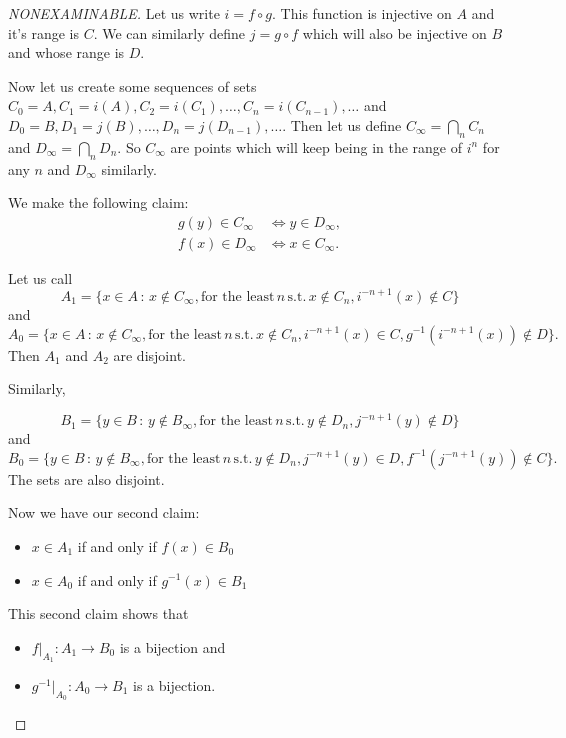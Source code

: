 \documentclass[
]{book}
\theoremstyle{definition}
\theoremstyle{definition}
\theoremstyle{definition}
\theoremstyle{definition}
\theoremstyle{remark}
\begin{document}
\begin{proof}[NONEXAMINABLE]
Let us write \(i = f\circ g\). This function is injective on \(A\) and it's range is \(C\). We can similarly define \(j = g \circ f\) which will also be injective on \(B\) and whose range is \(D\).

Now let us create some sequences of sets \(C_0 = A, C_1 = i(A), C_2=i(C_1), \dots, C_n = i(C_{n-1}), \dots\) and \(D_0 = B, D_1= j(B), \dots, D_n = j(D_{n-1}), \dots\). Then let us define \(C_\infty = \bigcap_n C_n\) and \(D_\infty = \bigcap_n D_n\). So \(C_\infty\) are points which will keep being in the range of \(i^n\) for any \(n\) and \(D_\infty\) similarly.

We make the following claim:
\begin{align}
g(y) \in C_\infty &\Leftrightarrow y \in D_\infty, \\
f(x) \in D_\infty &\Leftrightarrow x \in C_\infty.
\end{align}

Let us call
\[ A_1 = \{ x \in A \,:\, x \notin C_\infty, \mbox{for the least} \,n \, \mbox{s.t.}\, x \notin C_n, i^{-n+1}(x) \notin C\} \]
and
\[ A_0 = \{ x \in A \,:\, x \notin C_\infty, \mbox{for the least} \, n \, \mbox{s.t.}\, x \notin C_n, i^{-n+1}(x) \in C, g^{-1}(i^{-n+1}(x)) \notin D \}.\] Then \(A_1\) and \(A_2\) are disjoint.

Similarly,

\[ B_1 = \{y \in B\,:\, y \notin B_\infty, \mbox{for the least}\, n \, \mbox{s.t.}\, y \notin D_n, j^{-n+1}(y) \notin D\}\]
and
\[ B_0 = \{y \in B\,:\, y \notin B_\infty, \mbox{for the least}\, n \, \mbox{s.t.}\, y \notin D_n, j^{-n+1}(y) \in D, f^{-1}(j^{-n+1}(y)) \notin C\}.\] The sets are also disjoint.

Now we have our second claim:

\begin{itemize}
\item
  \(x \in A_1\) if and only if \(f(x) \in B_0\)
\item
  \(x \in A_0\) if and only if \(g^{-1}(x) \in B_1\)
\end{itemize}

This second claim shows that

\begin{itemize}
\item
  \(f|_{A_1} : A_1 \rightarrow B_0\) is a bijection and
\item
  \(g^{-1}|_{A_0} : A_0 \rightarrow B_1\) is a bijection.
\end{itemize}


\end{proof}
\end{document}
